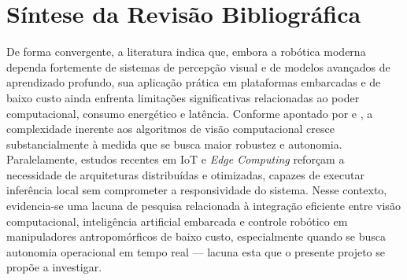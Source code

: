 \section*{Síntese da Revisão Bibliográfica}

De forma convergente, a literatura indica que, embora a robótica moderna dependa fortemente de sistemas de percepção visual e de modelos avançados de aprendizado profundo, sua aplicação prática em plataformas embarcadas e de baixo custo ainda enfrenta limitações significativas relacionadas ao poder computacional, consumo energético e latência. Conforme apontado por  e , a complexidade inerente aos algoritmos de visão computacional cresce substancialmente à medida que se busca maior robustez e autonomia. Paralelamente, estudos recentes em IoT e \textit{Edge Computing}  reforçam a necessidade de arquiteturas distribuídas e otimizadas, capazes de executar inferência local sem comprometer a responsividade do sistema. Nesse contexto, evidencia-se uma lacuna de pesquisa relacionada à integração eficiente entre visão computacional, inteligência artificial embarcada e controle robótico em manipuladores antropomórficos de baixo custo, especialmente quando se busca autonomia operacional em tempo real — lacuna esta que o presente projeto se propõe a investigar.